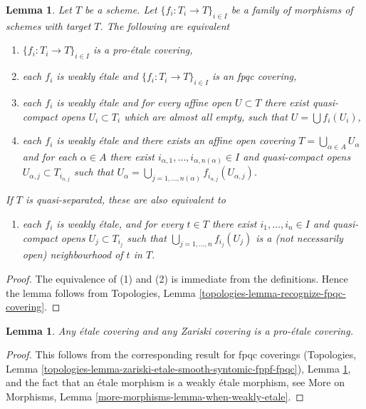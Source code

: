 \documentclass{stacks-project}
\theoremstyle{plain}
\newtheorem{lemma}[subsection]{Lemma}
\theoremstyle{definition}
\theoremstyle{remark}
\numberwithin{equation}{subsection}
\begin{document}
\begin{lemma}
\label{lemma-recognize-proetale-covering}
Let $T$ be a scheme. Let $\{f_i : T_i \to T\}_{i \in I}$ be a family of
morphisms of schemes with target $T$. The following are equivalent
\begin{enumerate}
\item $\{f_i : T_i \to T\}_{i \in I}$ is a pro-\'etale covering,
\item each $f_i$ is weakly \'etale and $\{f_i : T_i \to T\}_{i \in I}$
is an fpqc covering,
\item each $f_i$ is weakly \'etale and for every affine open $U \subset T$
there exist quasi-compact opens $U_i \subset T_i$ which are almost all empty,
such that $U = \bigcup f_i(U_i)$,
\item each $f_i$ is weakly \'etale and there exists an affine open covering
$T = \bigcup_{\alpha \in A} U_\alpha$ and for each $\alpha \in A$
there exist $i_{\alpha, 1}, \ldots, i_{\alpha, n(\alpha)} \in I$
and quasi-compact opens $U_{\alpha, j} \subset T_{i_{\alpha, j}}$ such that
$U_\alpha =
\bigcup_{j = 1, \ldots, n(\alpha)} f_{i_{\alpha, j}}(U_{\alpha, j})$.
\end{enumerate}
If $T$ is quasi-separated, these are also equivalent to
\begin{enumerate}
\item[(5)] each $f_i$ is weakly \'etale, and for every $t \in T$ there exist
$i_1, \ldots, i_n \in I$ and quasi-compact opens $U_j \subset T_{i_j}$
such that $\bigcup_{j = 1, \ldots, n} f_{i_j}(U_j)$ is a
(not necessarily open) neighbourhood of $t$ in $T$.
\end{enumerate}
\end{lemma}

\begin{proof}
The equivalence of (1) and (2) is immediate from the definitions.
Hence the lemma follows from
Topologies, Lemma \ref{topologies-lemma-recognize-fpqc-covering}.
\end{proof}

\begin{lemma}
\label{lemma-etale-proetale}
Any \'etale covering and any Zariski covering is a pro-\'etale covering.
\end{lemma}

\begin{proof}
This follows from the corresponding result for fpqc coverings
(Topologies, Lemma
\ref{topologies-lemma-zariski-etale-smooth-syntomic-fppf-fpqc}),
Lemma \ref{lemma-recognize-proetale-covering}, and
the fact that an \'etale morphism is a weakly \'etale morphism, see
More on Morphisms, Lemma \ref{more-morphisms-lemma-when-weakly-etale}.
\end{proof}
\end{document}

